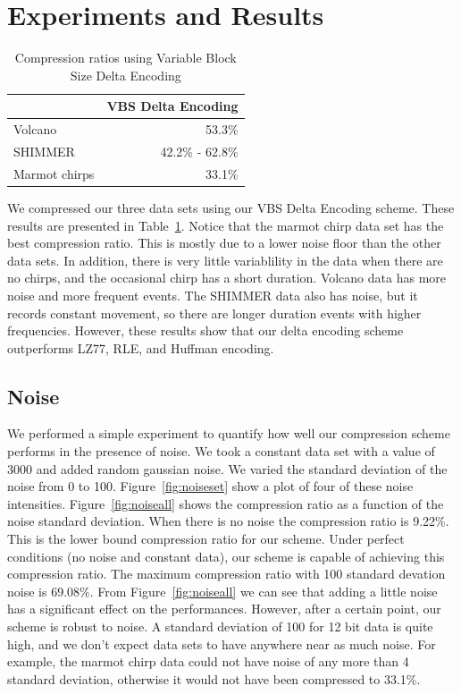 \section{Experiments and Results}
\label{sec-experiments}

\begin{table}
  \begin{center}
  \begin{tabular}{|l||r|}
    \hline
    & VBS Delta Encoding \\ \hline
    Volcano & 53.3\% \\ \hline
    SHIMMER & 42.2\% - 62.8\% \\ \hline
    Marmot chirps & 33.1\% \\ \hline
    
  \end{tabular}
  \end{center}
  \caption{Compression ratios using Variable Block Size Delta Encoding}
  \label{table:vbsde}
\end{table}

We compressed our three data sets using our VBS Delta Encoding
scheme. These results are presented in Table~\ref{table:vbsde}. Notice
that the marmot chirp data set has the best compression ratio. This is
mostly due to a lower noise floor than the other data sets. In
addition, there is very little variablility in the data when there are
no chirps, and the occasional chirp has a short duration. Volcano data
has more noise and more frequent events. The SHIMMER data also has
noise, but it records constant movement, so there are longer duration
events with higher frequencies. However, these results show that our
delta encoding scheme outperforms LZ77, RLE, and Huffman encoding.

\subsection{Noise}

We performed a simple experiment to quantify how well our compression
scheme performs in the presence of noise. We took a constant data set
with a value of 3000 and added random gaussian noise. We varied the
standard deviation of the noise from 0 to
100. Figure~\ref{fig:noiseset} show a plot of four of these noise
intensities. Figure~\ref{fig:noiseall} shows the compression ratio as
a function of the noise standard deviation. When there is no noise the
compression ratio is 9.22\%. This is the lower bound compression ratio
for our scheme. Under perfect conditions (no noise and constant data),
our scheme is capable of achieving this compression ratio. The maximum
compression ratio with 100 standard devation noise is 69.08\%. From
Figure~\ref{fig:noiseall} we can see that adding a little noise has a
significant effect on the performances. However, after a certain
point, our scheme is robust to noise. A standard deviation of 100 for
12 bit data is quite high, and we don't expect data sets to have
anywhere near as much noise. For example, the marmot chirp data could
not have noise of any more than 4 standard deviation, otherwise it
would not have been compressed to 33.1\%.

